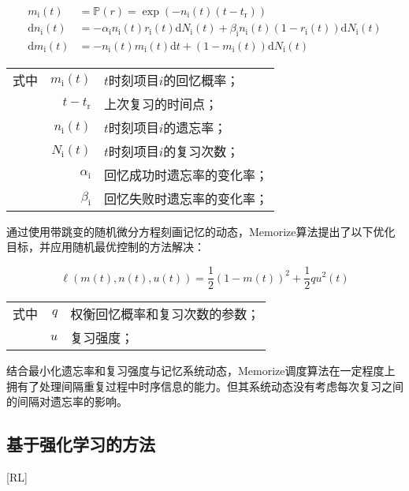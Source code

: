 \begin{equation}
\begin{aligned}
    m_\mathrm{i}(t)&=\mathbb{P}(r)=\exp (-n_\mathrm{i}(t)(t-t_\mathrm{r}))\\
    \mathrm{d} n_\mathrm{i}(t)&=-\alpha_\mathrm{i} n_\mathrm{i}(t) r_\mathrm{i}(t) \mathrm{d} N_\mathrm{i}(t)+\beta_\mathrm{i} n_\mathrm{i}(t)(1-r_\mathrm{i}(t)) \mathrm{d} N_\mathrm{i}(t)\\
    \mathrm{d} m_\mathrm{i}(t)&=-n_\mathrm{i}(t) m_\mathrm{i}(t) \mathrm{d} t+(1-m_\mathrm{i}(t)) \mathrm{d} N_\mathrm{i}(t)
\end{aligned}
\end{equation}
\begin{tabularx}{\textwidth}{@{}l@{\quad}r@{———}X@{}}
    式中& $m_\mathrm{i}(t)$ &$t$时刻项目$i$的回忆概率；\\
    & $t-t_\mathrm{r}$ &上次复习的时间点；\\
    & $n_\mathrm{i}(t)$ &$t$时刻项目$i$的遗忘率；\\
    & $N_\mathrm{i}(t)$ &$t$时刻项目$i$的复习次数；\\
    & $\alpha_\mathrm{i}$ &回忆成功时遗忘率的变化率；\\
    & $\beta_\mathrm{i}$ &回忆失败时遗忘率的变化率；\\
\end{tabularx}\vspace{3.15bp}

通过使用带跳变的随机微分方程刻画记忆的动态，Memorize算法提出了以下优化目标，并应用随机最优控制的方法解决：

\begin{equation}
    \ell(m(t), n(t), u(t))=\frac{1}{2}(1-m(t))^{2}+\frac{1}{2} q u^{2}(t)
\end{equation}
\begin{tabularx}{\textwidth}{@{}l@{\quad}r@{———}X@{}}
    式中& $q$ &权衡回忆概率和复习次数的参数；\\
    & $u$ &复习强度；
\end{tabularx}\vspace{3.15bp}

结合最小化遗忘率和复习强度与记忆系统动态，Memorize调度算法在一定程度上拥有了处理间隔重复过程中时序信息的能力。但其系统动态没有考虑每次复习之间的间隔对遗忘率的影响。

\subsection{基于强化学习的方法}[RL]

